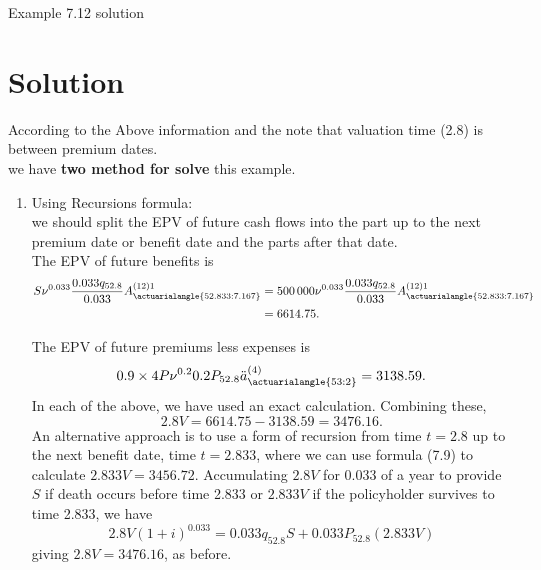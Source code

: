 	\begin{solve}{}{Example 7.12 solution}
		\section*{Solution}
		According to the Above information and the note that valuation time (2.8) is between premium dates.\\
		
		we have \textbf{two method for solve} this example.
	\begin{enumerate}
		\item Using Recursions formula:\\
		we should split the EPV of future cash flows into the part up to the next premium date or benefit date and the parts
		after that date.\\
		The EPV of future benefits is 
		\begin{align*} S \nu^{0.033} \frac{0.033 q_{52.8}}{0.033} A_{\actuarialangle{52.833:7.167}}^{(12) 1} &= 500\,000 \nu^{0.033} \frac{0.033 q_{52.8}}{0.033} A_{\actuarialangle{52.833:7.167}}^{(12) 1} \\ &= 6614.75. 
		\end{align*}
		
		The EPV of future premiums less expenses is \[ 0.9 \times 4 P \nu^{0.2} 0.2 P_{52.8} \ddot{a}_{\actuarialangle{53:2}}^{(4)} = 3138.59.\] In each of the above, we have used an exact calculation. Combining these, \[ 2.8 V = 6614.75 - 3138.59 = 3476.16. \] An alternative approach is to use a form of recursion from time \( t = 2.8 \) up to the next benefit date, time \( t = 2.833 \), where we can use formula (7.9) to calculate \( 2.833 V = 3456.72 \). Accumulating \( 2.8 V \) for 0.033 of a year to provide \( S \) if death occurs before time 2.833 or \( 2.833 V \) if the policyholder survives to time 2.833, we have \[ 2.8 V (1 + i)^{0.033} = 0.033 q_{52.8} S + 0.033 P_{52.8} (2.833 V) \] giving \( 2.8 V = 3476.16 \), as before.
		$$$$
	\end{enumerate}
		
	\end{solve}
	\vspace{2ex}
	
	
	
%	
%	
%	

